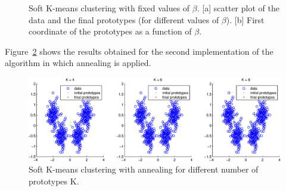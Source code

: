 \documentclass[a4paper,english]{article}
\begin{document}
\begin{figure}[h!]
{}
\caption{Soft K-means clustering with fixed values of $\beta$. [a] scatter plot of the data and the final prototypes (for different values of $\beta$). [b] First coordinate of the prototypes as a function of $\beta$. }
\label{soft_km}
\end{figure}

Figure~\ref{soft_km_an} shows the results obtained for the second implementation of the algorithm in which annealing is applied.

\begin{figure}[h!]
\centering
\includegraphics[scale = 0.75]{ex4_soft_kmeans_annealing}
\caption{Soft K-means clustering with annealing for different number of prototypes K.}
\label{soft_km_an}
\end{figure}
\end{document}
